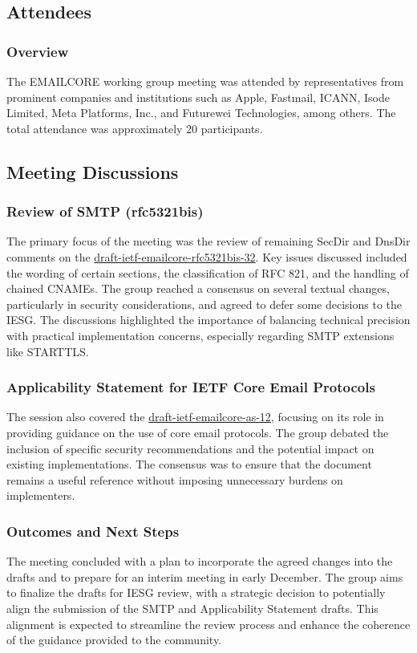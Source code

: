 \documentclass{article}
\begin{document}
\subsection{Attendees}
\subsubsection{Overview}
The EMAILCORE working group meeting was attended by representatives from prominent companies and institutions such as Apple, Fastmail, ICANN, Isode Limited, Meta Platforms, Inc., and Futurewei Technologies, among others. The total attendance was approximately 20 participants.

\subsection{Meeting Discussions}

\subsubsection{Review of SMTP (rfc5321bis)}
The primary focus of the meeting was the review of remaining SecDir and DnsDir comments on the \href{https://datatracker.ietf.org/doc/html/draft-ietf-emailcore-rfc5321bis-32}{draft-ietf-emailcore-rfc5321bis-32}. Key issues discussed included the wording of certain sections, the classification of RFC 821, and the handling of chained CNAMEs. The group reached a consensus on several textual changes, particularly in security considerations, and agreed to defer some decisions to the IESG. The discussions highlighted the importance of balancing technical precision with practical implementation concerns, especially regarding SMTP extensions like STARTTLS.

\subsubsection{Applicability Statement for IETF Core Email Protocols}
The session also covered the \href{https://datatracker.ietf.org/doc/html/draft-ietf-emailcore-as-12}{draft-ietf-emailcore-as-12}, focusing on its role in providing guidance on the use of core email protocols. The group debated the inclusion of specific security recommendations and the potential impact on existing implementations. The consensus was to ensure that the document remains a useful reference without imposing unnecessary burdens on implementers.

\subsubsection{Outcomes and Next Steps}
The meeting concluded with a plan to incorporate the agreed changes into the drafts and to prepare for an interim meeting in early December. The group aims to finalize the drafts for IESG review, with a strategic decision to potentially align the submission of the SMTP and Applicability Statement drafts. This alignment is expected to streamline the review process and enhance the coherence of the guidance provided to the community.
\end{document}
